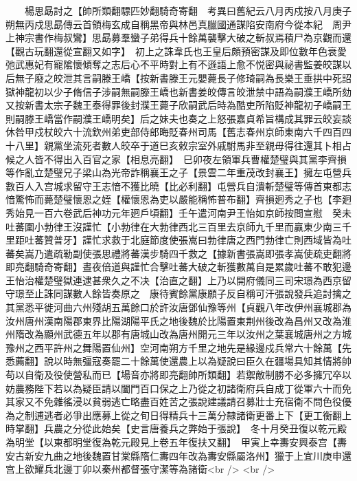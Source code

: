 　　楊思勗討之【帥所類翻驃匹妙翻騎奇寄翻　考異曰舊紀云八月丙戍按八月庚子朔無丙戍思勗傳云首領梅玄成自稱黑帝與林邑真臘國通謀陷安南府今從本紀　周尹上神宗書作梅叔鸞】思勗募羣蠻子弟得兵十餘萬襲擊大破之斬叔焉積尸為京觀而還【觀古玩翻還從宣翻又如字】　初上之誅韋氏也王皇后頗預密謀及即位數年色衰愛弛武惠妃有寵隂懷傾奪之志后心不平時對上有不遜語上愈不悦密與祕書監姜皎謀以后無子廢之皎泄其言嗣滕王嶠【按新書滕王元嬰薨長子修琦嗣為長樂王垂拱中死詔獄神龍初以少子脩信子涉嗣無嗣滕王嶠也新書姜皎傳言皎泄禁中語為嗣濮王嶠所劾又按新書太宗子魏王泰得罪後封濮王薨子欣嗣武后時為酷吏所陷貶神龍初子嶠嗣王則嗣滕王嶠當作嗣濮王嶠明矣】后之妹夫也奏之上怒張嘉貞希旨構成其罪云皎妄談休咎甲戍杖皎六十流欽州弟吏部侍郎晦貶春州司馬【舊志春州京師東南六千四百四十八里】親黨坐流死者數人皎卒于道巳亥敕宗室外戚駙馬非至親毋得往還其卜相占候之人皆不得出入百官之家【相息亮翻】　巳卯夜左領軍兵曹權楚璧與其黨李齊損等作亂立楚璧兄子梁山為光帝詐稱襄王之子【景雲二年重茂改封襄王】擁左屯營兵數百人入宫城求留守王志愔不獲比曉【比必利翻】屯營兵自潰斬楚璧等傳首東都志愔驚怖而薨楚璧懷恩之姪【權懷恩為吏以嚴能稱怖普布翻】齊損㢠秀之子也【李㢠秀始見一百六卷武后神功元年㢠戶頃翻】壬午遣河南尹王怡如京師按問宣慰　癸未吐蕃圍小勃律王沒謹忙【小勃律在大勃律西北三百里去京師九千里而贏東少南三千里距吐蕃贊普牙】謹忙求救于北庭節度使張嵩曰勃律唐之西門勃律亡則西域皆為吐蕃矣嵩乃遣疏勒副使張思禮將蕃漢步騎四千救之【據新書張嵩即張孝嵩使疏吏翻將即亮翻騎奇寄翻】晝夜倍道與謹忙合擊吐蕃大破之斬獲數萬自是累歲吐蕃不敢犯邊　王怡治權楚璧獄連逮甚衆久之不决【治直之翻】上乃以開府儀同三司宋璟為西京留守璟至止誅同謀數人餘皆奏原之　康待賓餘黨康願子反自稱可汗張說發兵追討擒之其黨悉平徙河曲六州殘胡五萬餘口於許汝唐鄧仙豫等州【貞觀八年改伊州襄城郡為汝州唐州漢南陽郡東界比陽湖陽平氏之地後魏於比陽置東荆州後改為昌州又改為淮州隋改為顯州武德五年以郡有唐城山改為唐州開元三年以汝州之葉襄城唐州之方城豫州之西平許州之舞陽置仙州】空河南朔方千里之地先是緣邊戍兵常六十餘萬【先悉薦翻】說以時無彊寇奏罷二十餘萬使還農上以為疑說曰臣久在疆場具知其情將帥苟以自衛及役使營私而已【場音亦將即亮翻帥所類翻】若禦敵制勝不必多擁冗卒以妨農務陛下若以為疑臣請以闔門百口保之上乃從之初諸衛府兵自成丁從軍六十而免其家又不免雜徭浸以貧弱逃亡略盡百姓苦之張說建議請召募壯士充宿衛不問色役優為之制逋逃者必爭出應募上從之旬日得精兵十三萬分隸諸衛更番上下【更工衡翻上時掌翻】兵農之分從此始矣【史言唐養兵之弊始于張說】　冬十月癸丑復以乾元殿為明堂【以東都明堂復為乾元殿見上卷五年復扶又翻】　甲寅上幸夀安興泰宫【夀安古新安九曲之地後魏置甘棠縣隋仁夀四年改為夀安縣屬洛州】獵于上宜川庚申還宫上欲耀兵北邊丁卯以秦州都督張守潔等為諸衛<br />
<br />
